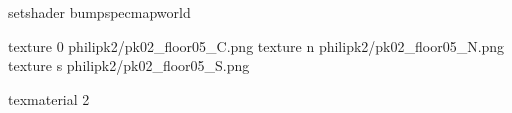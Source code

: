 setshader bumpspecmapworld

texture 0 philipk2/pk02_floor05_C.png
texture n philipk2/pk02_floor05_N.png
texture s philipk2/pk02_floor05_S.png

texmaterial 2
